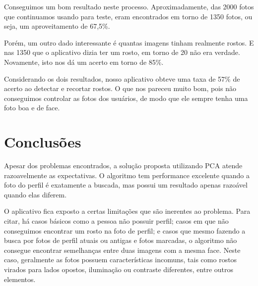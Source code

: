 \documentclass[10pt,a4paper]{article}
\begin{document}
Conseguimos um bom resultado neste processo. Aproximadamente,
das 2000 fotos que continuamos usando para teste, eram
encontrados em torno de 1350 fotos, ou seja, um aproveitamento
de 67,5\%.

Porém, um outro dado interessante é quantas imagens tinham
realmente rostos. E nas 1350 que o aplicativo dizia ter um
rosto, em torno de 20 não era verdade. Novamente, isto nos dá
um acerto em torno de 85\%.

Considerando os dois resultados, nosso aplicativo obteve uma
taxa de 57\% de acerto ao detectar e recortar rostos. O que
nos pareceu muito bom, pois não conseguimos controlar as fotos
dos usuários, de modo que ele sempre tenha uma foto boa e de face.

\section{Conclusões}

Apesar dos problemas encontrados, a solução proposta utilizando PCA
atende razoavelmente as expectativas. O algoritmo tem performance
excelente quando a foto do perfil é exatamente a buscada, mas possui
um resultado apenas razoável quando elas diferem.

O aplicativo fica exposto a certas limitações que são
inerentes ao problema. Para citar, há casos básicos como a
pessoa não possuir perfil; casos em que não conseguimos
encontrar um rosto na foto de perfil; e casos que mesmo
fazendo a busca por fotos de perfil atuais ou antigas e fotos
marcadas, o algoritmo não consegue encontrar semelhanças entre
duas imagens com a mesma face. Neste caso, geralmente as fotos
possuem características incomuns, tais como rostos virados
para lados opostos, iluminação ou contraste diferentes, 
entre outros elementos.

\begin{small}
  
\end{small}
\end{document}
